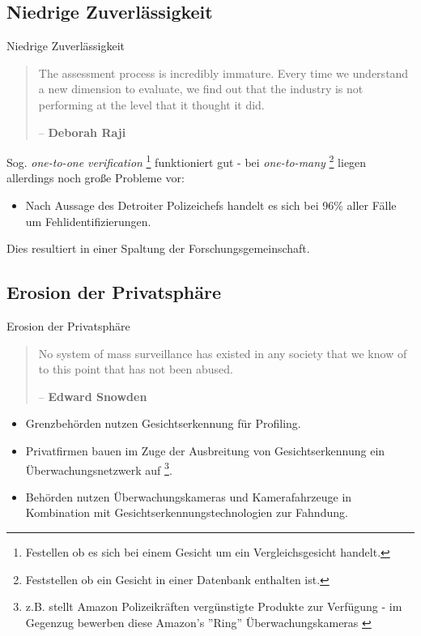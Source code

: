 \documentclass[10pt]{beamer}
\begin{document}
\subsection{Niedrige Zuverlässigkeit}
\begin{frame}{Niedrige Zuverlässigkeit}
  \begin{quote}
    The assessment process is incredibly immature. Every time we understand a new dimension to evaluate, we find out that the industry is not performing at the level that it thought it did. \\ \begin{center}
      -- \textbf{Deborah Raji} \cite{NatureBias}
    \end{center}
  \end{quote}

  Sog. \emph{one-to-one verification} \footnote{Festellen ob es sich bei einem Gesicht um ein Vergleichsgesicht handelt.} funktioniert gut - bei \emph{one-to-many} \footnote{Feststellen ob ein Gesicht in einer Datenbank enthalten ist.} liegen allerdings noch große Probleme vor:

  \pause
  \begin{itemize}
    \item Nach Aussage des Detroiter Polizeichefs handelt es sich bei 96\% aller Fälle um Fehlidentifizierungen. \cite{NatureBias}
  \end{itemize}

  \pause
  Dies resultiert in einer Spaltung der Forschungsgemeinschaft.
\end{frame}

\subsection{Erosion der Privatsphäre}
\begin{frame}{Erosion der Privatsphäre}
  \begin{quote}
    No system of mass surveillance has existed in any society that we know of to this point that has not been abused. \\ \begin{center}
      -- \textbf{Edward Snowden} \cite{SnowdenInterview}
    \end{center}
  \end{quote}

  \begin{itemize}
    \item Grenzbehörden nutzen Gesichtserkennung für Profiling. \cite{NatureHalt}
          \pause \item Privatfirmen bauen  im Zuge der Ausbreitung von Gesichtserkennung ein Überwachungsnetzwerk auf \footnote{z.B. stellt Amazon Polizeikräften vergünstigte Produkte zur Verfügung - im Gegenzug bewerben diese Amazon's ''Ring'' Überwachungskameras \cite{NatureHalt}}.
          \pause \item Behörden nutzen Überwachungskameras und Kamerafahrzeuge in Kombination mit Gesichtserkennungstechnologien zur Fahndung. \cite{HelloWorld}
  \end{itemize}
\end{frame}
\end{document}

